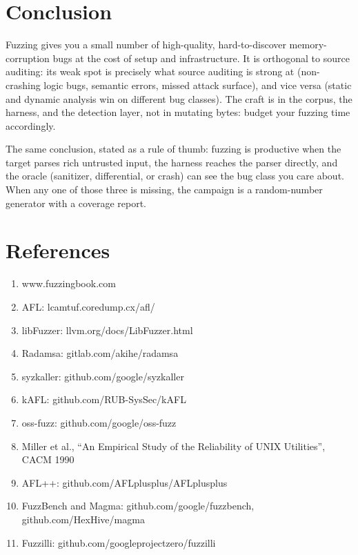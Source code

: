 \documentclass[12pt]{Training}
\begin{document}

\section*{Conclusion}
Fuzzing gives you a small number of high-quality, hard-to-discover memory-corruption bugs at the cost of setup and infrastructure. It is orthogonal to source auditing: its weak spot is precisely what source auditing is strong at (non-crashing logic bugs, semantic errors, missed attack surface), and vice versa (static and dynamic analysis win on different bug classes). The craft is in the corpus, the harness, and the detection layer, not in mutating bytes: budget your fuzzing time accordingly.

The same conclusion, stated as a rule of thumb: fuzzing is productive when the target parses rich untrusted input, the harness reaches the parser directly, and the oracle (sanitizer, differential, or crash) can see the bug class you care about. When any one of those three is missing, the campaign is a random-number generator with a coverage report.

\section*{References}
\begin{enumerate}
	\item www.fuzzingbook.com
	\item AFL: lcamtuf.coredump.cx/afl/
	\item libFuzzer: llvm.org/docs/LibFuzzer.html
	\item Radamsa: gitlab.com/akihe/radamsa
	\item syzkaller: github.com/google/syzkaller
	\item kAFL: github.com/RUB-SysSec/kAFL
	\item oss-fuzz: github.com/google/oss-fuzz
	\item Miller et al., ``An Empirical Study of the Reliability of UNIX Utilities'', CACM 1990
	\item AFL++: github.com/AFLplusplus/AFLplusplus
	\item FuzzBench and Magma: github.com/google/fuzzbench, github.com/HexHive/magma
	\item Fuzzilli: github.com/googleprojectzero/fuzzilli
\end{enumerate}
\end{document}
